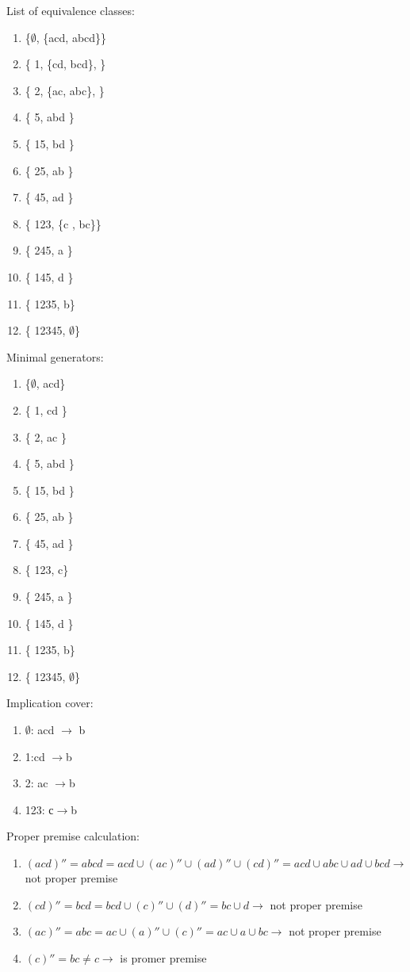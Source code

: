 \begin{minipage}{0.45\textwidth}
List of equivalence classes:
\begin{enumerate}
\item \{$\emptyset$, \{acd, abcd\}\}
\item \{ 1, \{cd, bcd\}, \}
\item \{ 2, \{ac, abc\}, \}
\item \{ 5, abd \}
\item \{ 15, bd \}
\item \{ 25, ab \}
\item \{ 45, ad \}
\item \{ 123, \{c , bc\}\}
\item \{ 245, a \}
\item \{ 145, d \}
\item \{ 1235, b\}
\item \{ 12345, $\emptyset$\}
\end{enumerate}
\end{minipage}
\hfill
\begin{minipage}{0.45\textwidth}
Minimal generators:
\begin{enumerate}
\item \{$\emptyset$, acd\}
\item \{ 1, cd \}
\item \{ 2, ac \}
\item \{ 5, abd \}
\item \{ 15, bd \}
\item \{ 25, ab \}
\item \{ 45, ad \}
\item \{ 123, c\}
\item \{ 245, a \}
\item \{ 145, d \}
\item \{ 1235, b\}
\item \{ 12345, $\emptyset$\}
\end{enumerate}
\end{minipage}

Implication cover:
\begin{enumerate}
\item $\emptyset$: acd $\rightarrow$ b
\item 1:cd $\rightarrow$b
\item 2: ac $\rightarrow $b
\item 123: с$\rightarrow$b
\end{enumerate}

Proper premise calculation:
\begin{enumerate}
\item $(acd)'' = abcd = acd \cup (ac)'' \cup (ad)'' \cup (cd)'' = acd \cup abc \cup ad \cup bcd \rightarrow$ not proper premise
\item $(cd)'' = bcd = bcd \cup (c)'' \cup (d)'' = bc \cup d \rightarrow $ not proper premise
\item $(ac)'' = abc = ac \cup (a)'' \cup (c)'' = ac \cup a \cup bc \rightarrow $ not proper premise
\item $(c)'' = bc \neq c \rightarrow $ is promer premise
\end{enumerate}


